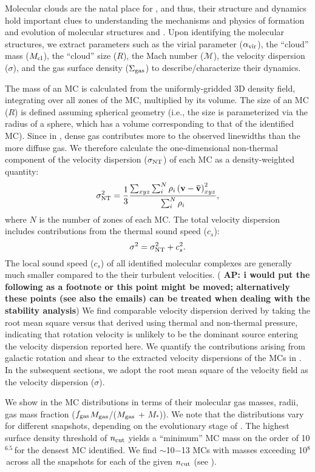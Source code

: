 \documentclass[iop]{emulateapj} %
\newcommand{\AP}[1]{({\bf \color{apcolor} AP: #1})}
\begin{document}
Molecular clouds are the natal place for \SF, and thus,
their structure and dynamics hold important clues to understanding
the mechanisms and physics of formation and evolution of molecular structures and \SF.
Upon identifying the molecular structures, we extract parameters such as
the virial parameter ($\alpha_{\rm vir}$),
the ``cloud'' mass ($M_{\rm cl}$),
the ``cloud'' size ($R$),
the Mach number ($\mathcal{M}$),
the velocity dispersion ($\sigma$), and the
gas surface density ($\Sigma_{\rm gas}$)
to describe/characterize their dynamics.

The mass of an MC is calculated from the uniformly-gridded 3D density field,
integrating over all zones of the MC, multiplied by its volume. 
The size of an MC ($R$) is defined assuming spherical geometry (i.e., 
the size is parameterized via the radius of a sphere, which has a volume corresponding to that of the identified MC).
Since in \obs, dense gas contributes more to the observed linewidths than the more diffuse gas. We therefore calculate 
the one-dimensional non-thermal component of the velocity dispersion ($\sigma_{\rm NT}$) of each MC as a density-weighted quantity:
\begin{equation}
\sigma_{\rm NT}^2 = \frac{1}{{3}}\frac{\sum_{xyz} \sum_{i}^N \rho_i \left(\mathbf{v} - \mathbf{\bar v}\right)_{xyz}^2}{\sum_i^N \rho_i},
\end{equation}
where $N$ is the number of zones of each MC.
The total velocity dispersion includes contributions from the thermal sound speed ($c_s$):
\begin{equation}
\sigma^2 = \sigma_{\rm NT}^2 + c_s^2.
\end{equation}
The local sound speed ($c_s$)
of all identified molecular complexes are generally much smaller compared to the their
turbulent velocities.
\AP{i would put the following as a footnote or this point might be moved; alternatively these points (see also the emails) can be treated when dealing with the stability analysis}
We find comparable velocity dispersion derived by taking the root mean square versus
that derived using thermal and non-thermal pressure, indicating that
rotation velocity is unlikely to be the dominant source entering the velocity dispersion reported here.
We quantify the contributions arising from galactic rotation and shear to the extracted velocity dispersions of the MCs in .
In the subsequent sections, we adopt the root mean square of the velocity field
as the velocity dispersion ($\sigma$).


We show in  the MC distributions in terms of their
molecular gas masses, radii, gas mass fraction ($f_{\rm gas}$\eq$M_{\rm gas}$/($M_{\rm gas}$ +
$M_*$)).
We note that the distributions vary for different snapshots, depending on the evolutionary stage of \flower.
The highest surface density threshold of $n_{\rm cut}$ yields a ``minimum'' MC mass on
the order of 10$^{6.5}$\,\Msun for the densest MC identified.
We find $\sim$10$-$13 MCs with masses exceeding 10$^8$\,\Msun across all the
snapshots for each of the given $n_{\rm cut}$ (see ).
\end{document}

